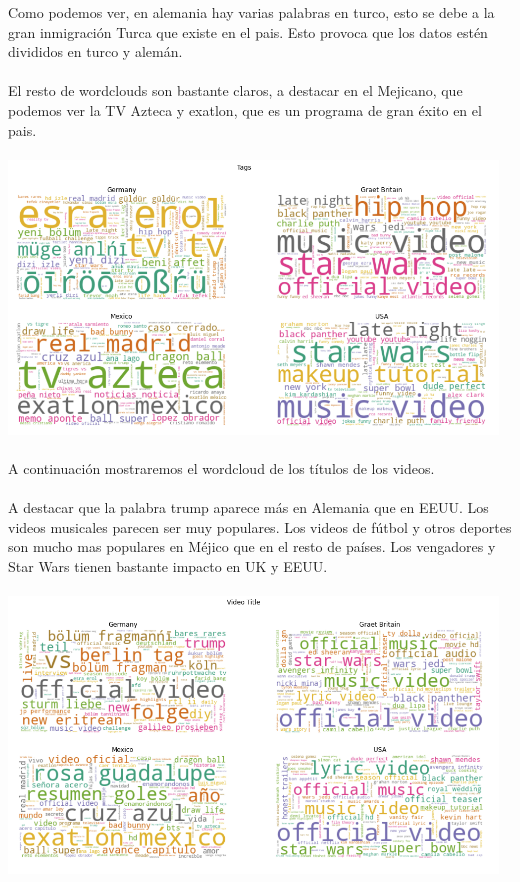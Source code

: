 \documentclass[a4paper,12pt]{article}
\begin{document}
Como podemos ver,  en alemania hay varias palabras en turco, esto se debe a la gran inmigraci\'on Turca que existe en el pais. Esto provoca que los datos est\'en divididos en turco y alem\'an.
\\
\\
El resto de wordclouds son bastante claros, a destacar en el Mejicano, que podemos ver la TV Azteca y exatlon, que es un programa de gran \'exito en el pais.
\\
\\
\includegraphics[width=13cm]{wordcloud_tags.png}
\\
\\
A continuaci\'on mostraremos el wordcloud de los t\'itulos de los videos.
\\
\\
A destacar que la palabra trump aparece m\'as en Alemania que en EEUU. Los videos musicales parecen ser muy populares. Los videos de f\'utbol y otros deportes son mucho mas populares en M\'ejico que en el resto de pa\'ises. Los vengadores y Star Wars tienen bastante impacto en UK y EEUU.
\\
\\
\includegraphics[width=13cm]{wordcloud_title.png}
\end{document}
